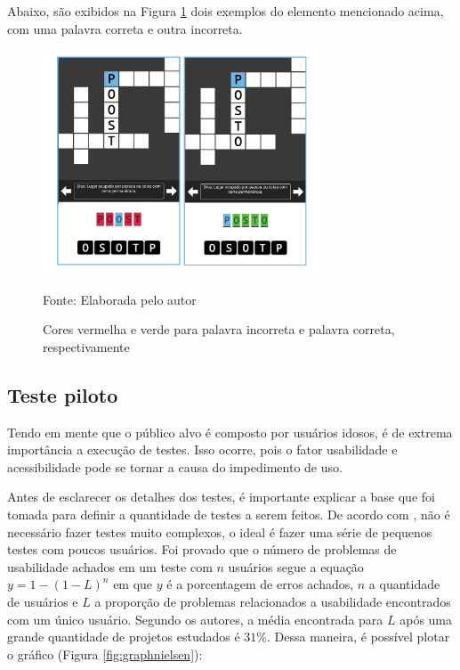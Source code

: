 Abaixo, são exibidos na Figura \ref{fig:verdevermelho} dois exemplos do elemento mencionado acima, com uma palavra correta e outra incorreta.

\begin{figure}[H]
\centering
    \caption{Cores vermelha e verde para palavra incorreta e palavra correta, respectivamente}
    \label{fig:verdevermelho}
    \includegraphics[width=0.75\textwidth]{Figuras/verdevermelho.jpg}
    
    Fonte: Elaborada pelo autor
\end{figure}


\subsection{Teste piloto}
Tendo em mente que o público alvo é composto por usuários idosos, é de extrema importância a execução de testes. Isso ocorre, pois o fator usabilidade e acessibilidade pode se tornar a causa do impedimento de uso.

Antes de esclarecer os detalhes dos testes, é importante explicar a base que foi tomada para definir a quantidade de testes a serem feitos. De acordo com \cite{nielsenUsabilityMath}, não é necessário fazer testes muito complexos, o ideal é fazer uma série de pequenos testes com poucos usuários. Foi provado que o número de problemas de usabilidade achados em um teste com $n$ usuários segue a equação $y = 1-(1-L)^n$ em que $y$ é a porcentagem de erros achados, $n$ a quantidade de usuários e $L$ a proporção de problemas relacionados a usabilidade encontrados com um único usuário. Segundo os autores, a média encontrada para $L$ após uma grande quantidade de projetos estudados é $31\%$. Dessa maneira, é possível plotar o gráfico (Figura \ref{fig:graphnielsen}):

